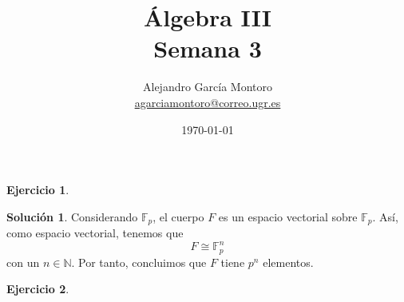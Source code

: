 \documentclass[a4paper, 11pt]{article}
\title{Álgebra III \\ Semana 3}
\author{Alejandro García Montoro\\
    \href{mailto:agarciamontoro@correo.ugr.es}{agarciamontoro@correo.ugr.es}}
\date{\today}
\theoremstyle{definition}
\newtheorem{ejercicio}{Ejercicio}
\newtheorem*{solucion}{Solución}
\theoremstyle{remark}
\begin{document}
  \maketitle

  \begin{ejercicio}
  \end{ejercicio}

  \begin{solucion}
      Considerando $\mathbb{F}_p$, el cuerpo $F$ es un espacio vectorial sobre $\mathbb{F}_p$. Así, como espacio vectorial, tenemos que
      \[
      F \cong \mathbb{F}_p^n
      \]
      con un $n\in\mathbb{N}$. Por tanto, concluimos que $F$ tiene $p^n$ elementos.
  \end{solucion}

  \begin{ejercicio}
  \end{ejercicio}
\end{document}
